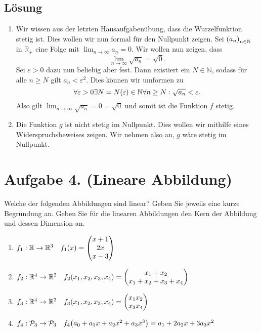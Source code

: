 \documentclass[german,12pt]{homework}
\newcommand{\NN}{\mathbb{N}}
\newcommand{\RR}{\mathbb{R}}
\newcommand{\PP}{\mathcal{P}}
\DeclarePairedDelimiter{\enbrace}{(}{)}
\begin{document}
    \subsection*{Lösung}
    \begin{enumerate}
        \item Wir wissen aus der letzten Hausaufgabenübung, dass die
        Wurzelfunktion stetig ist. Dies wollen wir nun formal für den Nullpunkt
        zeigen. Sei \(\enbrace*{a_n}_{n \in \NN}\) in \(\RR_+\) eine Folge mit
        \(\lim_{n \to \infty}a_n = 0\). Wir wollen nun zeigen, dass
        \[\lim_{n \to \infty}\sqrt{a_n} = \sqrt{0}.\]
        Sei \(\varepsilon > 0\) dazu nun beliebig aber fest. Dann existiert ein
        \(N \in \NN\), sodass für alle \(n \ge N\) gilt \(a_n < \varepsilon^2\).
        Dies können wir umformen zu
        \[{\forall}\varepsilon > 0{\exists}N = N\enbrace*{\varepsilon} \in \NN
        {\forall}n \ge N: \sqrt{a_n} < \varepsilon.\]
        Also gilt \(\lim_{n \to \infty}\sqrt{a_n} = 0 = \sqrt{0}\) und somit ist
        die Funktion \(f\) stetig.
        \item Die Funktion \(g\) ist nicht stetig im Nullpunkt. Dies wollen wir
        mithilfe eines Widerspruchsbeweises zeigen. Wir nehmen also an, \(g\)
        wäre stetig im Nullpunkt.
    \end{enumerate}

    \section*{Aufgabe 4. (Lineare Abbildung)}

    \begin{problem}
        Welche der folgenden Abbildungen sind linear? Geben Sie jeweils eine
        kurze Begründung an. Geben Sie für die linearen Abbildungen den Kern der
        Abbildung und dessen Dimension an.
        \begin{enumerate}
            \item \(f_1: \RR \to \RR^3 \quad f_1\enbrace*{x} = \begin{pmatrix}
            x + 1\\2x\\x - 3\end{pmatrix}\)
            \item \(f_2: \RR^4 \to \RR^2 \quad f_2\enbrace*{x_1, x_2, x_3, x_4}
            = \begin{pmatrix}x_1 + x_2\\x_1 + x_2 + x_3 + x_4\end{pmatrix}\)
            \item \(f_3: \RR^4 \to \RR^2 \quad f_3\enbrace*{x_1, x_2, x_3, x_4}
            = \begin{pmatrix}x_1x_2\\x_3x_4\end{pmatrix}\)
            \item \(f_4: \PP_3 \to \PP_3 \quad f_4\enbrace*{a_0 + a_1x + a_2x^2
            + a_3x^3} = a_1 + 2a_2x + 3a_3x^2\)
        \end{enumerate}
    \end{problem}
\end{document}
